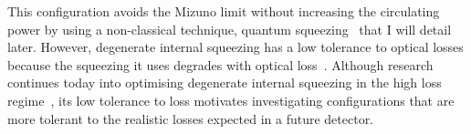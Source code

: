 This configuration avoids the Mizuno limit without increasing the circulating power by using a non-classical technique, quantum squeezing~\cite{miaoFundamentalQuantumLimit2017} that I will detail later. %
However, degenerate internal squeezing has a low tolerance to optical losses because the squeezing it uses degrades with optical loss~\cite{korobkoQuantumExpanderGravitationalwave2019}. 
Although research continues today into optimising degenerate internal squeezing in the high loss regime~\cite{korobkoCompensatingQuantumDecoherenceTalk2021}, its low tolerance to loss motivates investigating configurations that are more tolerant to the realistic losses expected in a future detector. %

